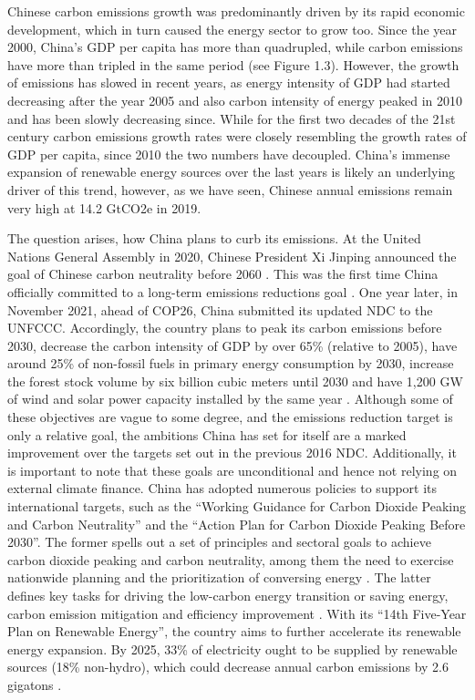 \documentclass[
  12pt,
]{article}
\numberwithin{equation}{section}
\numberwithin{table}{section}
\numberwithin{figure}{section}
\begin{document}
Chinese carbon emissions growth was predominantly driven by its rapid
economic development, which in turn caused the energy sector to grow
too. Since the year 2000, China's GDP per capita has more than
quadrupled, while carbon emissions have more than tripled in the same
period (see Figure 1.3). However, the growth of emissions has slowed in
recent years, as energy intensity of GDP had started decreasing after
the year 2005 and also carbon intensity of energy peaked in 2010 and has
been slowly decreasing since. While for the first two decades of the
21st century carbon emissions growth rates were closely resembling the
growth rates of GDP per capita, since 2010 the two numbers have
decoupled. China's immense expansion of renewable energy sources over
the last years is likely an underlying driver of this trend, however, as
we have seen, Chinese annual emissions remain very high at 14.2 GtCO2e
in 2019.

The question arises, how China plans to curb its emissions. At the
United Nations General Assembly in 2020, Chinese President Xi Jinping
announced the goal of Chinese carbon neutrality before 2060
\citep{Jinping2020}. This was the first time China officially committed
to a long-term emissions reductions goal \citep{CAT2022}. One year
later, in November 2021, ahead of COP26, China submitted its updated NDC
to the UNFCCC. Accordingly, the country plans to peak its carbon
emissions before 2030, decrease the carbon intensity of GDP by over 65\%
(relative to 2005), have around 25\% of non-fossil fuels in primary
energy consumption by 2030, increase the forest stock volume by six
billion cubic meters until 2030 and have 1,200 GW of wind and solar
power capacity installed by the same year \citep{China2021}. Although
some of these objectives are vague to some degree, and the emissions
reduction target is only a relative goal, the ambitions China has set
for itself are a marked improvement over the targets set out in the
previous 2016 NDC. Additionally, it is important to note that these
goals are unconditional and hence not relying on external climate
finance. China has adopted numerous policies to support its
international targets, such as the ``Working Guidance for Carbon Dioxide
Peaking and Carbon Neutrality'' and the ``Action Plan for Carbon Dioxide
Peaking Before 2030''. The former spells out a set of principles and
sectoral goals to achieve carbon dioxide peaking and carbon neutrality,
among them the need to exercise nationwide planning and the
prioritization of conversing energy \citep{DRCEP2021a}. The latter
defines key tasks for driving the low-carbon energy transition or saving
energy, carbon emission mitigation and efficiency improvement
\citep{DRCEP2021b}. With its ``14th Five-Year Plan on Renewable
Energy'', the country aims to further accelerate its renewable energy
expansion. By 2025, 33\% of electricity ought to be supplied by
renewable sources (18\% non-hydro), which could decrease annual carbon
emissions by 2.6 gigatons \citep{Zhou2022}.
\end{document}
